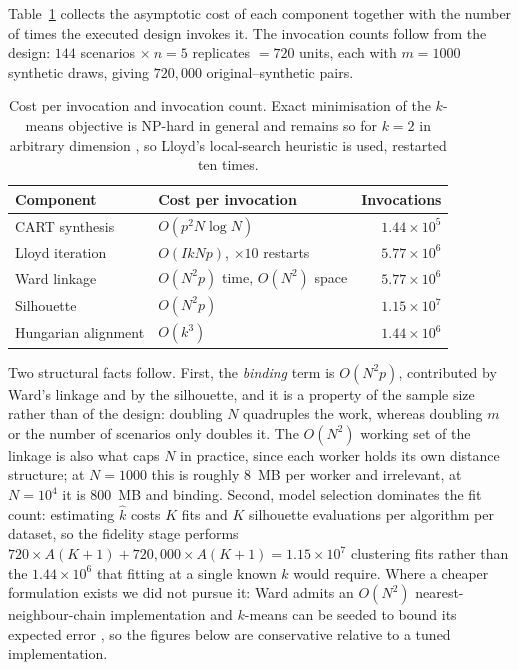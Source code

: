 \documentclass[pdflatex,sn-basic]{sn-jnl}
\begin{document}
\begin{appendices}
Table~\ref{tab:complexity} collects the asymptotic cost of each component
together with the number of times the executed design invokes it. The
invocation counts follow from the design: $144$ scenarios $\times\ n = 5$
replicates $= 720$ units, each with $m = 1000$ synthetic draws, giving
$720{,}000$ original--synthetic pairs.

\begin{table}[h]
\centering
\caption{Cost per invocation and invocation count. Exact minimisation of the
         $k$-means objective is NP-hard in general and remains so for $k = 2$
         in arbitrary dimension \citep{inaba1994}, so Lloyd's local-search
         heuristic \citep{lloyd1982} is used, restarted ten times.}
\label{tab:complexity}
\small
\begin{tabular}{llr}
\toprule
Component & Cost per invocation & Invocations \\
\midrule
CART synthesis \citep{breiman1984}      & $O(p^{2} N \log N)$ & $1.44 \times 10^{5}$ \\
Lloyd iteration \citep{macqueen1967,lloyd1982} & $O(IkNp)$, $\times 10$ restarts & $5.77 \times 10^{6}$ \\
Ward linkage \citep{ward1963,murtagh2017}      & $O(N^{2} p)$ time, $O(N^{2})$ space & $5.77 \times 10^{6}$ \\
Silhouette \citep{rousseeuw1987}               & $O(N^{2} p)$ & $1.15 \times 10^{7}$ \\
Hungarian alignment \citep{kuhn1955,jonker1987} & $O(k^{3})$ & $1.44 \times 10^{6}$ \\
\bottomrule
\end{tabular}
\end{table}

Two structural facts follow. First, the \emph{binding} term is $O(N^{2}p)$,
contributed by Ward's linkage and by the silhouette, and it is a property of the
sample size rather than of the design: doubling $N$ quadruples the work, whereas
doubling $m$ or the number of scenarios only doubles it. The $O(N^{2})$ working
set of the linkage is also what caps $N$ in practice, since each worker holds
its own distance structure; at $N = 1000$ this is roughly $8$~MB per worker and
irrelevant, at $N = 10^{4}$ it is $800$~MB and binding. Second, model selection
dominates the fit count: estimating $\hat{k}$ costs $K$ fits and $K$ silhouette
evaluations per algorithm per dataset, so the fidelity stage performs
$720 \times A(K{+}1) + 720{,}000 \times A(K{+}1) = 1.15 \times 10^{7}$
clustering fits rather than the $1.44 \times 10^{6}$ that fitting at a single
known $k$ would require. Where a cheaper formulation exists we did not pursue
it: Ward admits an $O(N^{2})$ nearest-neighbour-chain implementation
\citep{murtagh2017,mullner2011} and $k$-means can be seeded to bound its
expected error \citep{arthur2007}, so the figures below are conservative
relative to a tuned implementation.


\end{appendices}
\end{document}
